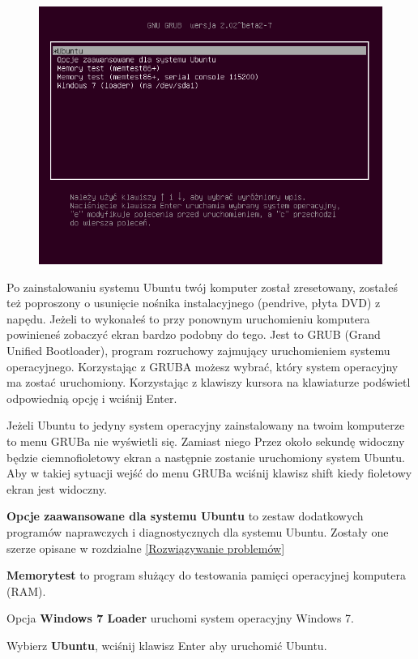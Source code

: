 \begin{figure}
		\includegraphics[width=\linewidth]{images/pierwsze_uruchomienie_grub.png}
\end{figure}

Po zainstalowaniu systemu Ubuntu twój komputer został zresetowany, zostałeś też poproszony o usunięcie nośnika instalacyjnego (pendrive, płyta DVD) z napędu. Jeżeli to wykonałeś to przy ponownym uruchomieniu komputera powinieneś zobaczyć ekran bardzo podobny do tego. Jest to GRUB (Grand Unified Bootloader), program rozruchowy zajmujący uruchomieniem systemu operacyjnego. Korzystając z GRUBA możesz wybrać, który system operacyjny ma zostać uruchomiony. Korzystając z klawiszy kursora na klawiaturze podświetl odpowiednią opcję i wciśnij Enter.

Jeżeli Ubuntu to jedyny system operacyjny zainstalowany na twoim komputerze to menu GRUBa nie wyświetli się. Zamiast niego Przez około sekundę widoczny będzie ciemnofioletowy ekran a następnie zostanie uruchomiony system Ubuntu. Aby w takiej sytuacji wejść do menu GRUBa wciśnij klawisz shift kiedy fioletowy ekran jest widoczny.

\textbf{Opcje zaawansowane dla systemu Ubuntu} to zestaw dodatkowych programów naprawczych i diagnostycznych dla systemu Ubuntu. Zostały one szerze opisane w rozdzialne \ref{Rozwiązywanie problemów}

\textbf{Memorytest} to program służący do testowania pamięci operacyjnej komputera (RAM).

Opcja \textbf{Windows 7 Loader} uruchomi system operacyjny Windows 7.

\begin{flushright}
Wybierz \textbf{Ubuntu}, wciśnij klawisz Enter aby uruchomić Ubuntu.
\end{flushright}
\clearpage